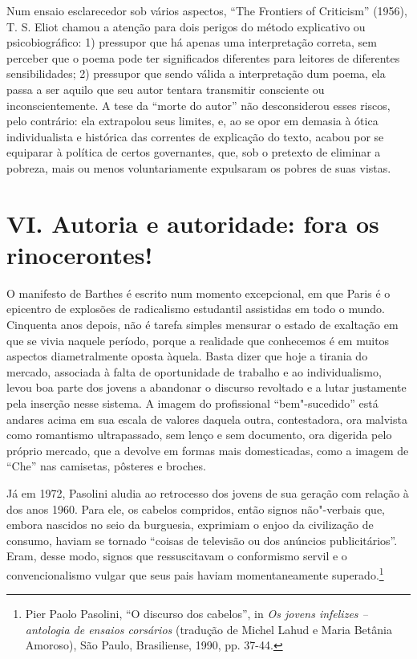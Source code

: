 Num ensaio esclarecedor sob vários aspectos, ``The Frontiers of
Criticism'' (1956), T. S. Eliot chamou a atenção para dois perigos do
método explicativo ou psicobiográfico: 1) pressupor que há apenas uma
interpretação correta, sem perceber que o poema pode ter significados
diferentes para leitores de diferentes sensibilidades; 2) pressupor que
sendo válida a interpretação dum poema, ela passa a ser aquilo que seu
autor tentara transmitir consciente ou inconscientemente. A tese da
``morte do autor'' não desconsiderou esses riscos, pelo contrário: ela
extrapolou seus limites, e, ao se opor em demasia à ótica individualista
e histórica das correntes de explicação do texto, acabou por se
equiparar à política de certos governantes, que, sob o pretexto de
eliminar a pobreza, mais ou menos voluntariamente expulsaram os pobres
de suas vistas.

\section*{VI. Autoria e autoridade: fora os rinocerontes!}

O manifesto de Barthes é escrito num momento excepcional, em que Paris é
o epicentro de explosões de radicalismo estudantil assistidas em todo o
mundo. Cinquenta anos depois, não é tarefa simples mensurar o estado de
exaltação em que se vivia naquele período, porque a realidade que
conhecemos é em muitos aspectos diametralmente oposta àquela. Basta
dizer que hoje a tirania do mercado, associada à falta de oportunidade
de trabalho e ao individualismo, levou boa parte dos jovens a abandonar
o discurso revoltado e a lutar justamente pela inserção nesse sistema. A
imagem do profissional ``bem"-sucedido'' está andares acima em sua escala
de valores daquela outra, contestadora, ora malvista como romantismo
ultrapassado, sem lenço e sem documento, ora digerida pelo próprio
mercado, que a devolve em formas mais domesticadas, como a imagem de
``Che'' nas camisetas, pôsteres e broches.

Já em 1972, Pasolini aludia ao retrocesso dos jovens de sua geração com
relação à dos anos 1960. Para ele, os cabelos compridos, então signos
não"-verbais que, embora nascidos no seio da burguesia, exprimiam o enjoo
da civilização de consumo, haviam se tornado ``coisas de televisão ou
dos anúncios publicitários''. Eram, desse modo, signos que ressuscitavam
o conformismo servil e o convencionalismo vulgar que seus pais haviam
momentaneamente superado.\footnote{Pier Paolo Pasolini, ``O discurso dos
  cabelos'', in \emph{Os jovens infelizes -- antologia de ensaios
  corsários} (tradução de Michel Lahud e Maria Betânia Amoroso), São
  Paulo, Brasiliense, 1990, pp. 37-44.}

